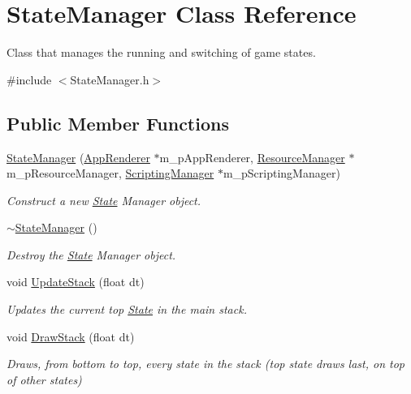 \hypertarget{classStateManager}{}\section{State\+Manager Class Reference}
\label{classStateManager}


Class that manages the running and switching of game states.  




{\ttfamily \#include $<$State\+Manager.\+h$>$}

\subsection*{Public Member Functions}
\begin{DoxyCompactItemize}
\item 
\hyperlink{classStateManager_ace918db0f769af43e0067ac425ef640a}{State\+Manager} (\hyperlink{classAppRenderer}{App\+Renderer} $\ast$m\+\_\+p\+App\+Renderer, \hyperlink{classResourceManager}{Resource\+Manager} $\ast$m\+\_\+p\+Resource\+Manager, \hyperlink{classScriptingManager}{Scripting\+Manager} $\ast$m\+\_\+p\+Scripting\+Manager)
\begin{DoxyCompactList}\small\item\em Construct a new \hyperlink{classState}{State} Manager object. \end{DoxyCompactList}\item 
\mbox{\label{classStateManager_a05a43504a033f1befad5c5118249ec6f}} 
\hyperlink{classStateManager_a05a43504a033f1befad5c5118249ec6f}{$\sim$\+State\+Manager} ()
\begin{DoxyCompactList}\small\item\em Destroy the \hyperlink{classState}{State} Manager object. \end{DoxyCompactList}\item 
void \hyperlink{classStateManager_a5e4bd4cb8c5928d33a04506dc8c8f350}{Update\+Stack} (float dt)
\begin{DoxyCompactList}\small\item\em Updates the current top \hyperlink{classState}{State} in the main stack. \end{DoxyCompactList}\item 
void \hyperlink{classStateManager_a2c6bb716a4c6a388f971544c6c23e1d9}{Draw\+Stack} (float dt)
\begin{DoxyCompactList}\small\item\em Draws, from bottom to top, every state in the stack (top state draws last, on top of other states) \end{DoxyCompactList}\item 

\end{DoxyCompactItemize}
